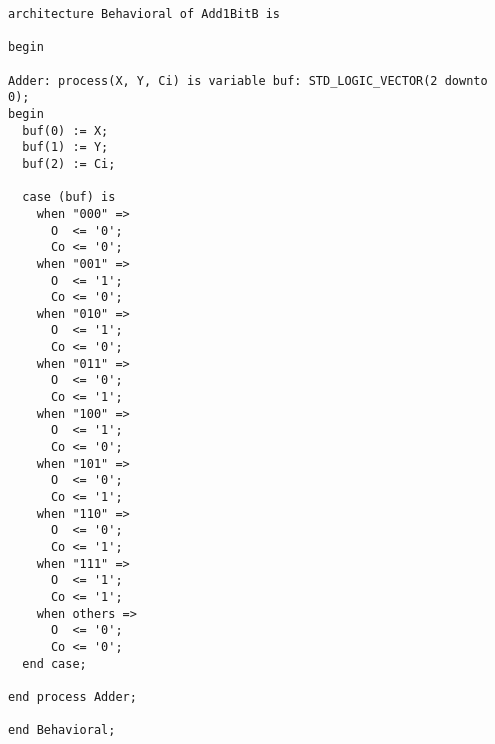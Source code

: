 \begin{verbatim}
architecture Behavioral of Add1BitB is

begin

Adder: process(X, Y, Ci) is variable buf: STD_LOGIC_VECTOR(2 downto 0);
begin
  buf(0) := X;
  buf(1) := Y;
  buf(2) := Ci;

  case (buf) is
    when "000" =>
      O  <= '0';
      Co <= '0';
    when "001" =>
      O  <= '1';
      Co <= '0';
    when "010" =>
      O  <= '1';
      Co <= '0';
    when "011" =>
      O  <= '0';
      Co <= '1';
    when "100" =>
      O  <= '1';
      Co <= '0';
    when "101" =>
      O  <= '0';
      Co <= '1';
    when "110" =>
      O  <= '0';
      Co <= '1';
    when "111" =>
      O  <= '1';
      Co <= '1';
    when others =>
      O  <= '0';
      Co <= '0';
  end case;

end process Adder;

end Behavioral;
\end{verbatim}

